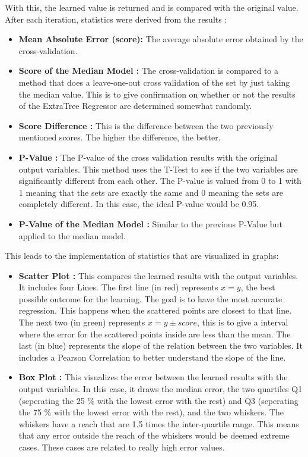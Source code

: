 \documentclass[a4paper,11pt]{report}
\numberwithin{figure}{section} %
\begin{document}
\begin{itemize}
        With this, the learned value is returned and is compared with the original value.
        After each iteration, statistics were derived from the results :
        \begin{itemize}
            \item \textbf{Mean Absolute Error (score):} The average absolute error obtained by the cross-validation.
            \item \textbf{Score of the Median Model :} The cross-validation is compared to a method that does a leave-one-out cross validation of the set by just taking the median value.
            This is to give confirmation on whether or not the results of the ExtraTree Regressor are determined somewhat randomly.
            \item \textbf{Score Difference :} This is the difference between the two previously mentioned scores.
            The higher the difference, the better.
            \item \textbf{P-Value :} The P-value of the cross validation results with the original output variables.
            This method uses the T-Test to see if the two variables are significantly different from each other.
            The P-value is valued from 0 to 1 with 1 meaning that the sets are exactly the same and 0 meaning the sets are completely different.
            In this case, the ideal P-value would be 0.95.
            \item \textbf{P-Value of the Median Model :} Similar to the previous P-Value but applied to the median model.
        \end{itemize}
        This leads to the implementation of statistics that are visualized in graphs:
        \begin{itemize}
            \item \textbf{Scatter Plot :} This compares the learned results with the output variables.
            It includes four Lines.
            The first line (in red) represents $x = y$, the best possible outcome for the learning.
            The goal is to have the most accurate regression.
            This happens when the scattered points are closest to that line.
            The next two (in green) represents $x = y \pm score$, this is to give a interval where the error for the scattered points inside are less than the mean.
            The last (in blue) represents the slope of the relation between the two variables.
            It includes a Pearson Correlation to better understand the slope of the line.
            \item \textbf{Box Plot :} This visualizes the error between the learned results with the output variables.
            In this case, it draws the median error, the two quartiles Q1 (seperating the 25 \% with the lowest error with the rest) and Q3 (seperating the 75 \% with the lowest error with the rest), and the two whiskers.
            The whiskers have a reach that are 1.5 times the inter-quartile range.
            This means that any error outside the reach of the whiskers would be deemed extreme cases.
            These cases are related to really high error values.
        \end{itemize}
    \end{itemize}
\end{document}
